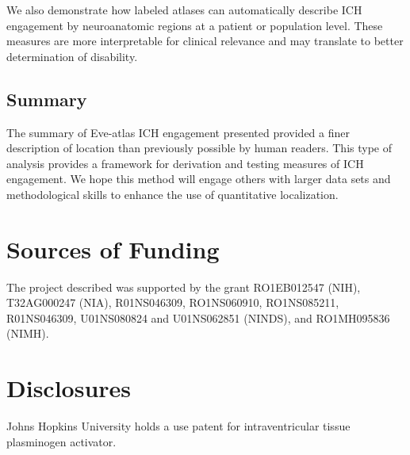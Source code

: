We also demonstrate how labeled atlases can automatically describe ICH engagement by neuroanatomic regions at a patient or population level. These measures are more interpretable for clinical relevance and may translate to better determination of disability.


\subsection{Summary}
The summary of Eve-atlas ICH engagement presented provided a finer description of location than previously possible by human readers. This type of analysis provides a framework for derivation and testing measures of ICH engagement.  We hope this method will engage others with larger data sets and methodological skills to enhance the use of quantitative localization. 



\section{Sources of Funding}
The project described was supported by the grant RO1EB012547 (NIH), T32AG000247 (NIA), R01NS046309, RO1NS060910, RO1NS085211, R01NS046309, U01NS080824 and U01NS062851 (NINDS), and RO1MH095836 (NIMH).

\section{Disclosures}
Johns Hopkins University holds a use patent for intraventricular tissue plasminogen activator.





%
  




\clearpage
\newpage
\thispagestyle{empty}
\pagestyle{plain}


